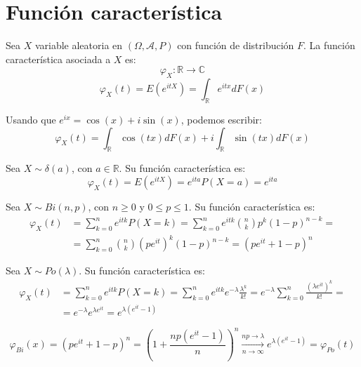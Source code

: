 \chapter{Función característica}
\begin{definition}
    Sea $X$ variable aleatoria en $(\Omega, \mathcal{A}, P)$ con función de distribución $F$.
    La función característica asociada a $X$ es:
    $$\varphi_X: \mathbb{R} \to \mathbb{C}$$
    $$\varphi_X(t) = E(e^{itX}) = \int_\mathbb{R} e^{itx}dF(x)$$
\end{definition}

\begin{remark}
    Usando que $e^{ix} = \cos(x) + i\sin(x)$, podemos escribir:
    $$\varphi_X(t) = \int_\mathbb{R} \cos(tx)dF(x) + i \int_\mathbb{R} \sin(tx)dF(x)$$
\end{remark}

\begin{example}
    Sea $X \sim \delta(a)$, con $a \in \mathbb{R}$.
    Su función característica es:
    $$\varphi_X(t) = E(e^{itX}) = e^{ita} P(X=a) = e^{ita}$$
\end{example}

\begin{example}
    Sea $X \sim Bi(n, p)$, con $n \geq 0$ y $0 \leq p \leq 1$.
    Su función característica es:
    \begin{align*}
        \varphi_X(t) & = \sum_{k=0}^n e^{itk} P(X=k) = \sum_{k=0}^n e^{itk} \binom{n}{k} p^k(1-p)^{n-k} = \\
                     & = \sum_{k=0}^n \binom{n}{k} (pe^{it})^k(1-p)^{n-k} = (pe^{it} + 1 - p)^n
    \end{align*}
\end{example}

\begin{example}
    Sea $X \sim Po(\lambda)$.
    Su función característica es:
    \begin{align*}
        \varphi_X(t) & = \sum_{k=0}^n e^{itk} P(X=k) = \sum_{k=0}^n e^{itk}e^{-\lambda}\frac{\lambda^k}{k!} = e^{-\lambda} \sum_{k=0}^n \frac{(\lambda e^{it})^k}{k!} = \\
                     & = e^{-\lambda}e^{\lambda e^{it}} = e^{\lambda(e^{it} - 1)}
    \end{align*}
\end{example}

\begin{remark}
    $$\varphi_{Bi}(x) = (pe^{it} + 1 - p)^n = \left( 1 + \frac{np(e^{it}-1)}{n} \right)^n \xrightarrow[n \to \infty]{np \to \lambda} e^{\lambda(e^{it} - 1)} = \varphi_{Po}(t)$$
\end{remark}

